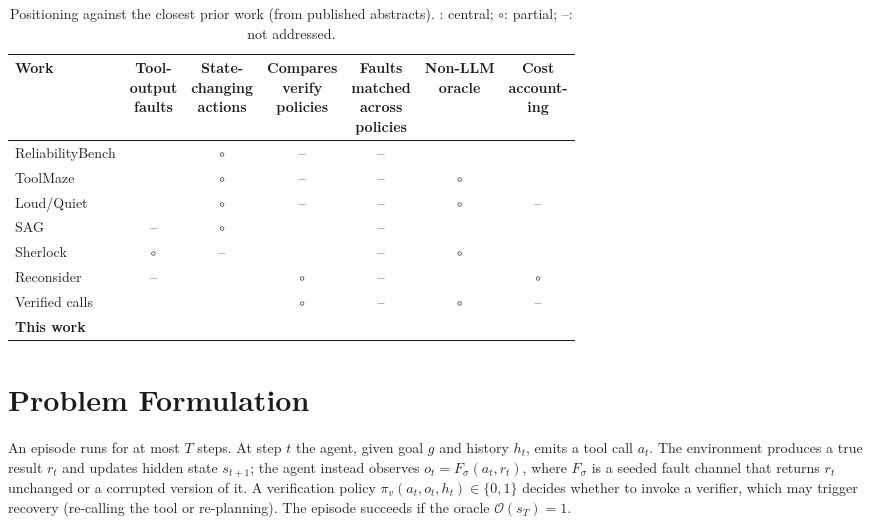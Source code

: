 \documentclass[conference]{IEEEtran}
\newcommand{\yes}{\checkmark}
\newcommand{\no}{--}
\newcommand{\pt}{$\circ$}
\begin{document}
\begin{table}[t]
\caption{Positioning against the closest prior work (from published abstracts).
\yes: central; \pt: partial; \no: not addressed.}
\label{tab:positioning}
\centering
\setlength{\tabcolsep}{3pt}
\footnotesize
\begin{tabular}{@{}lcccccc@{}}
\toprule
Work & \makecell{Tool-\\output\\faults} & \makecell{State-\\changing\\actions} & \makecell{Compares\\verify\\policies} & \makecell{Faults\\matched\\across\\policies} & \makecell{Non-LLM\\oracle} & \makecell{Cost\\account-\\ing} \\
\midrule
ReliabilityBench \cite{gupta2026reliabilitybench} & \yes & \pt & \no & \no & \yes & \yes \\
ToolMaze \cite{zhu2026toolmaze} & \yes & \pt & \no & \no & \pt & \yes \\
Loud/Quiet \cite{kraishan2026loud} & \yes & \pt & \no & \no & \pt & \no \\
SAG \cite{park2026sag} & \no & \pt & \yes & \no & \yes & \yes \\
Sherlock \cite{ro2025sherlock} & \pt & \no & \yes & \no & \pt & \yes \\
Reconsider \cite{chen2026reconsider} & \no & \yes & \pt & \no & \yes & \pt \\
Verified calls \cite{mansoor2026verifiedtools} & \yes & \yes & \pt & \no & \pt & \no \\
\textbf{This work} & \yes & \yes & \yes & \yes & \yes & \yes \\
\bottomrule
\end{tabular}
\end{table}

\section{Problem Formulation}
\label{sec:problem}

An episode runs for at most $T$ steps. At step $t$ the agent, given goal $g$ and history
$h_t$, emits a tool call $a_t$. The environment produces a true result $r_t$ and
updates hidden state $s_{t+1}$; the agent instead observes $o_t = F_\sigma(a_t, r_t)$,
where $F_\sigma$ is a seeded fault channel that returns $r_t$ unchanged or a corrupted version
of it. A verification policy $\pi_v(a_t, o_t, h_t) \in \{0,1\}$ decides whether to invoke a
verifier, which may trigger recovery (re-calling the tool or re-planning). The episode
succeeds if the oracle $\mathcal{O}(s_T) = 1$.
\end{document}
